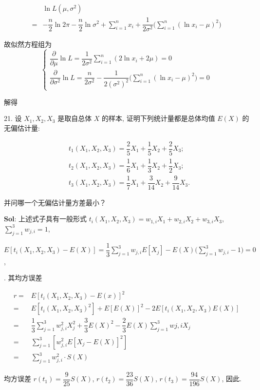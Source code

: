 $$
\begin{aligned}
    &\ln L(\mu,\sigma^2)\\
    =&-\dfrac{n}{2}\ln2\pi-\dfrac{n}{2}\ln\sigma^2+\sum_{i=1}^nx_i+\dfrac{1}{2\sigma^2}\Big(\sum_{i=1}^n(\ln x_i-\mu)^2\Big)
\end{aligned}
$$

故似然方程组为
$$
\begin{cases}
\displaystyle
    \dfrac{\partial}{\partial \mu }\ln L=\dfrac{1}{2\sigma^2}\sum_{i=1}^n(2\ln x_i+2\mu)=0\\
\displaystyle
    \dfrac{\partial}{\partial \sigma^2}\ln L=\dfrac{n}{2\sigma^2}-\dfrac{1}{2(\sigma^2)^2}\Big(\sum_{i=1}^n(\ln x_i-\mu)^2\Big)=0
\end{cases}
$$

解得 

\vspace{12pt}

21. 设 $X_1,X_2,X_3$ 是取自总体 $X$ 的样本, 证明下列统计量都是总体均值 $E(X)$ 的无偏估计量:

$$
\begin{aligned}
    &t_1(X_1,X_2,X_3)=\dfrac{2}{5}X_1+\dfrac{1}{5}X_2+\dfrac{2}{5}X_3;\\
    &t_2(X_1,X_2,X_3)=\dfrac{1}{6}X_1+\dfrac{1}{3}X_2+\dfrac{1}{2}X_3;\\
    &t_3(X_1,X_2,X_3)=\dfrac{1}{7}X_1+\dfrac{3}{14}X_2+\dfrac{9}{14}X_3.
\end{aligned}
$$

并问哪一个无偏估计量方差最小？

\textbf{Sol}: 上述式子具有一般形式 $t_i(X_1,X_2,X_3)=w_{1,i}X_1+w_{2,i}X_2+w_{3,i}X_3$, $\sum_{j=1}^3w_{j,i}=1$,  

$E[t_i(X_1,X_2,X_3)-E(X)]=\dfrac{1}{3}\sum_{j=1}^3w_{j,i}E[X_j]-E(X)\Big(\sum_{j=1}^3w_{j,i}-1\Big)=0$,

. 其均方误差

$$
\begin{aligned}
    r
    =&E[t_i(X_1,X_2,X_3)-E(x)]^2\\
    =&E[t_i(X_1,X_2,X_3)^2]+E[E(X)]^2-2E[t_i(X_1,X_2,X_3)E(X)]\\
    =&\dfrac{1}{3}\sum_{j=1}^3w_{j,i}^2X_{j}^2+\dfrac{3}{3}E(X)^2-\dfrac{2}{3}E(X)\sum_{j=1}^3w{j,i}X_j\\
    =&\sum_{j=1}^3[w_{j,i}^2E[X_j-E(X)]^2]\\
    =&\sum_{j=1}^3w_{j,i}^2\cdot S(X)
\end{aligned}
$$

均方误差 $r(t_1)=\dfrac{9}{25}S(X)$, $r(t_2)=\dfrac{23}{36}S(X)$, $r(t_3)=\dfrac{94}{196}S(X)$, 因此.
\vspace{12pt}



